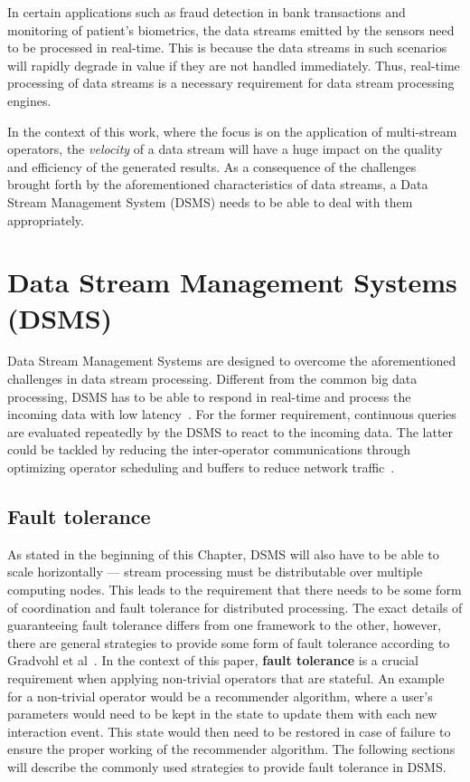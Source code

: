 In certain applications such as fraud detection in bank transactions and monitoring of 
patient's biometrics, the data streams emitted by the sensors need to be processed in 
real-time. This is because the data streams in such scenarios will rapidly degrade in 
value if they are not handled immediately. Thus, real-time processing of data streams 
is a necessary requirement for data stream processing engines. 

In the context of this work, where the focus is on the application of multi-stream operators, 
the \emph{velocity} of a data stream will have a huge impact on the quality and efficiency of 
the generated results. As a consequence of the challenges brought forth by the 
aforementioned characteristics of data streams, a Data Stream Management System (DSMS) needs 
to be able to deal with them appropriately.  

\section{Data Stream Management Systems (DSMS)} 
Data Stream Management Systems are designed to overcome the aforementioned challenges 
in data stream processing. Different from the common big data processing, DSMS has to be 
able to respond in real-time and process the incoming data with low latency~\cite{data_stream_management}. 
For the former requirement, continuous queries are evaluated repeatedly by the DSMS to react 
to the incoming data. The latter could be tackled by reducing the inter-operator communications 
through optimizing operator scheduling and buffers to reduce network traffic~\cite{low_latency_data_stream}. 



\subsection{Fault tolerance}
As stated in the beginning of this Chapter, DSMS will also have to be able to scale 
horizontally --- stream processing must be distributable over multiple computing nodes. 
This leads to the requirement that there needs to be some form of coordination and fault tolerance 
for distributed processing. The exact details of guaranteeing fault tolerance differs from 
one framework to the other, however,  there are general strategies to provide some 
form of fault tolerance according to Gradvohl et al~\cite{fault_tolerance_dsms}.
In the context of this paper, \textbf{fault tolerance} is a crucial requirement when applying
non-trivial operators that are stateful. 
An example for a non-trivial operator would be a recommender algorithm, where 
a user's parameters would need to be kept in the state to update them with each new 
interaction event. This state would then need to be restored in case of failure to 
ensure the proper working of the recommender algorithm.
The following sections will describe the commonly used strategies to provide fault tolerance 
in DSMS. 

